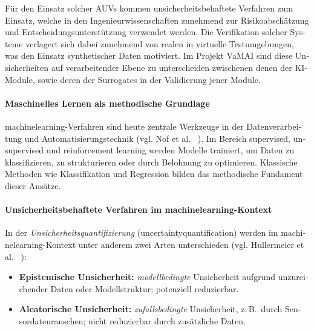 \begin{otherlanguage}{ngerman}
Für den Einsatz solcher AUVs kommen unsicherheitsbehaftete Verfahren zum Einsatz, welche in den Ingenieurwissenschaften zunehmend zur Risikoabschätzung und Entscheidungsunterstützung verwendet werden. Die Verifikation solcher Systeme verlagert sich dabei zunehmend von realen in virtuelle Testumgebungen, was den Einsatz synthetischer Daten motiviert. Im Projekt VaMAI sind diese Unsicherheiten auf verarbeitender Ebene zu unterscheiden zwischenen denen der KI-Module, sowie deren der Surrogates in der Validierung jener Module.


\paragraph{Maschinelles Lernen als methodische Grundlage} \gls{machinelearning}-Verfahren sind heute zentrale Werkzeuge in der Datenverarbeitung und Automatisierungstechnik (vgl. Nof et al. ~\parencite{Nof2023}). Im Bereich \glqq supervised\grqq, \glqq unsupervised\grqq{} und \glqq reinforcement learning\grqq{} werden Modelle trainiert, um Daten zu klassifizieren, zu strukturieren oder durch Belohnung zu optimieren. Klassische Methoden wie Klassifikation und Regression bilden das methodische Fundament dieser Ansätze.

\paragraph{Unsicherheitsbehaftete Verfahren im \gls{machinelearning}-Kontext} In der \textit{Unsicherheitsquantifizierung} (\gls{uncertaintyquantification}) werden im \gls{machinelearning}-Kontext unter anderem zwei Arten unterschieden (vgl. Hullermeier et al. ~\parencite[{S.458, \glqq Sources of uncertainty in supervised learning\grqq{}, \gls{Aleatorische Unsicherheit} Z.23-27, \gls{Epistemische Unsicherheit} Z.23-25}]{Hullermeier2021}):

\begin{itemize}
  \item \textbf{\gls{Epistemische Unsicherheit}:} \textit{modellbedingte} Unsicherheit aufgrund unzureichender Daten oder Modellstruktur; potenziell reduzierbar.
  \item \textbf{\gls{Aleatorische Unsicherheit}:} \textit{zufallsbedingte} Unsicherheit, z.\,B.\ durch Sensordatenrauschen; nicht reduzierbar durch zusätzliche Daten.
\end{itemize}


\end{otherlanguage}
